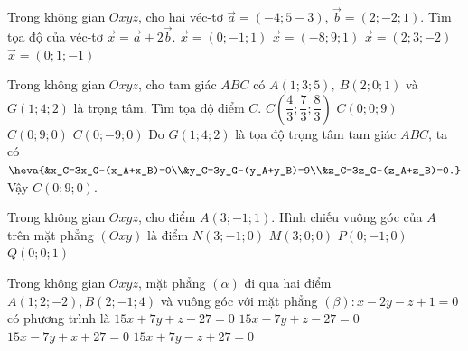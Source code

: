 \begin{ex}%
	Trong không gian $Oxyz$, cho hai véc-tơ $\overrightarrow{a}=(-4;5-3)$, $\overrightarrow{b}=(2;-2;1)$. Tìm tọa độ của véc-tơ $\overrightarrow{x}=\overrightarrow{a}+2\overrightarrow{b}$.
	\choice
	{$\overrightarrow{x}=(0;-1;1)$}
	{$\overrightarrow{x}=(-8;9;1)$}
	{$\overrightarrow{x}=(2;3;-2)$}
	{\True $\overrightarrow{x}=(0;1;-1)$}
\end{ex}

\begin{ex}%
	Trong không gian $Oxyz$, cho tam giác $ABC$ có $A(1;3;5),~B(2;0;1)$ và $G(1;4;2)$ là trọng tâm. Tìm tọa độ điểm $C$.
	\choice
	{$C\left(\dfrac{4}{3};\dfrac{7}{3};\dfrac{8}{3}\right)$}
	{$C(0;0;9)$}
	{\True $C(0;9;0)$}
	{$C(0;-9;0)$}
	\loigiai
	{
		Do $G(1;4;2)$ là tọa độ trọng tâm tam giác $ABC$, ta có $\heva{&x_C=3x_G-(x_A+x_B)=0\\&y_C=3y_G-(y_A+y_B)=9\\&z_C=3z_G-(z_A+z_B)=0.}$\\
		Vậy $C(0;9;0)$.
	}
\end{ex}

\begin{ex}%
	Trong không gian $Oxyz$, cho điểm $A(3;-1;1)$. Hình chiếu vuông góc của $A$ trên mặt phẳng $(Oxy)$ là điểm
	\choice
	{\True $N(3;-1;0)$}
	{$M(3;0;0)$}
	{$P(0;-1;0)$}
	{$Q(0;0;1)$}
\end{ex}
\begin{ex}%
	Trong không gian $Oxyz$, mặt phẳng $(\alpha)$ đi qua hai điểm $A(1;2;-2), B(2;-1;4)$ và vuông góc với mặt phẳng $(\beta)\colon x-2y-z+1=0$ có phương trình là
	\choice
	{\True $15x+7y+z-27=0$}
	{$15x-7y+z-27=0$}
	{$15x-7y+x+27=0$}
	{$15x+7y-z+27=0$}
\end{ex}


